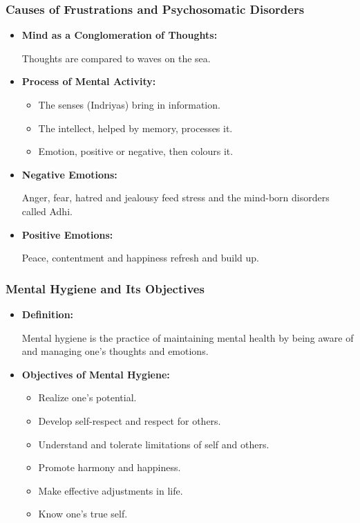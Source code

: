 \begin{frame}[fragile]\frametitle{Causes of Frustrations and Psychosomatic Disorders}

      \begin{itemize}
        \item \textbf{Mind as a Conglomeration of Thoughts:}
        
        Thoughts are compared to waves on the sea.

        \item \textbf{Process of Mental Activity:}
        \begin{itemize}
            \item The senses (Indriyas) bring in information.
            \item The intellect, helped by memory, processes it.
            \item Emotion, positive or negative, then colours it.
        \end{itemize}
        \item \textbf{Negative Emotions:}

        Anger, fear, hatred and jealousy feed stress and the mind-born disorders called Adhi.

        \item \textbf{Positive Emotions:}

        Peace, contentment and happiness refresh and build up.
        
      \end{itemize}

\end{frame}

\begin{frame}[fragile]\frametitle{Mental Hygiene and Its Objectives}

      \begin{itemize}
        \item \textbf{Definition:}
        
        Mental hygiene is the practice of maintaining mental health by being aware of and managing one's thoughts and emotions.
        
        \item \textbf{Objectives of Mental Hygiene:}
        \begin{itemize}
            \item Realize one's potential.
            \item Develop self-respect and respect for others.
            \item Understand and tolerate limitations of self and others.
            \item Promote harmony and happiness.
            \item Make effective adjustments in life.
            \item Know one's true self.
        \end{itemize}
      \end{itemize}

\end{frame}


